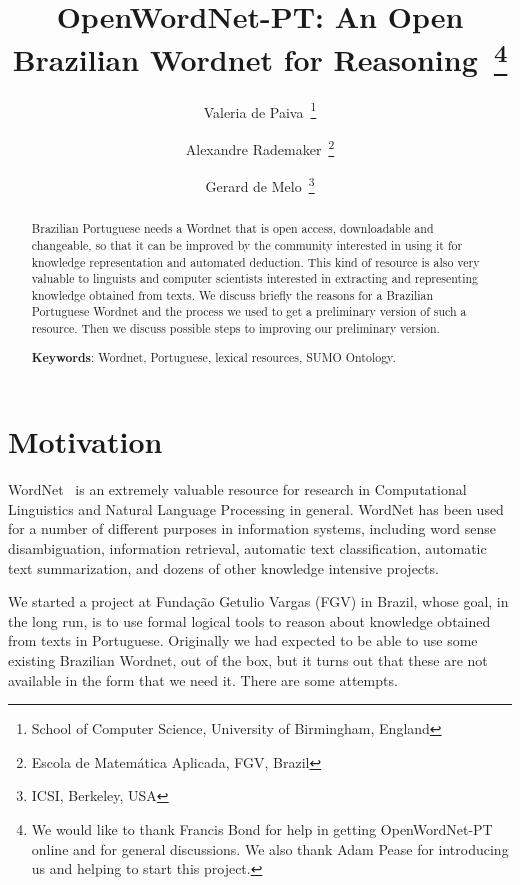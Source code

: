 \documentclass[a4paper,twocolumn]{article}
\begin{document}
\cover

\title{OpenWordNet-PT: An Open Brazilian Wordnet for
  Reasoning~\thanks{We would like to thank Francis Bond for help in
    getting OpenWordNet-PT online and for general discussions. We also
    thank Adam Pease for introducing us and helping to start this
    project.}}

\author{Valeria de Paiva~\thanks{School of Computer Science, University of Birmingham, England} 
  \and Alexandre Rademaker~\thanks{Escola de Matem\'{a}tica Aplicada, FGV, Brazil} 
  \and Gerard de Melo~\thanks{ICSI, Berkeley, USA}}

\maketitle

\begin{abstract}
  Brazilian Portuguese needs a Wordnet that is open access,
  downloadable and changeable, so that it can be improved by the
  community interested in using it for knowledge representation and
  automated deduction. This kind of resource is also very valuable to
  linguists and computer scientists interested in extracting and
  representing knowledge obtained from texts. We discuss briefly the
  reasons for a Brazilian Portuguese Wordnet and the process we used
  to get a preliminary version of such a resource.  Then we discuss
  possible steps to improving our preliminary version.

  \textbf{Keywords}: Wordnet, Portuguese, lexical resources, SUMO
  Ontology.
\end{abstract}


\section{Motivation}

WordNet~\cite{wordnet} is an extremely valuable resource for research
in Computational Linguistics and Natural Language Processing in
general.  WordNet has been used for a number of different purposes in
information systems, including word sense disambiguation, information
retrieval, automatic text classification, automatic text
summarization, and dozens of other knowledge intensive projects.

We started a project at Funda\c{c}\~ao Getulio Vargas (FGV) in Brazil,
whose goal, in the long run, is to use formal logical tools to reason
about knowledge obtained from texts in Portuguese.
Originally we had expected to be able to use some existing Brazilian
Wordnet, out of the box, but it turns out that these are not available
in the form that we need it.  There are some attempts.
\end{document}
